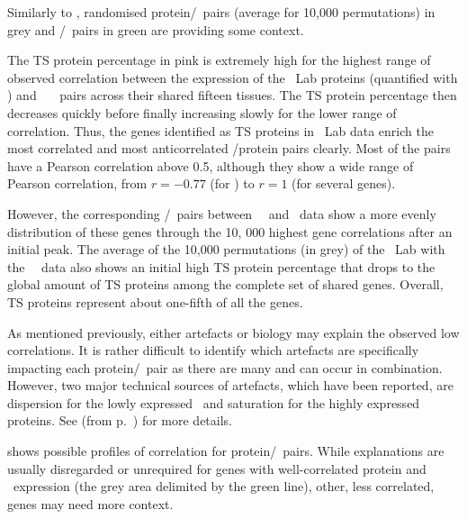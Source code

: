 Similarly to ,
randomised protein/\mRNA\ pairs (average for 10,000 permutations) in grey
and \mRNA/\mRNA\ pairs in green are providing some context.

The \gls{TS} protein percentage in pink is extremely high
for the highest range of observed correlation between the expression of
the \pandey\ Lab proteins (quantified with \PPKM) and
\uhlen\ \etal\ \mRNAs\ pairs
across their shared fifteen tissues.
The \gls{TS} protein percentage then decreases quickly
before finally increasing slowly for the lower range of correlation.
Thus, the genes identified as \gls{TS} proteins in \pandey\ Lab data enrich
the most correlated and most anticorrelated \mRNA/protein pairs clearly.
Most of the pairs have a Pearson correlation above 0.5,
although they show a wide range of Pearson correlation,
from $r= -0.77$ (for ) to $r=1$ (for several genes).

However,
the corresponding \mRNA/\mRNA\ pairs between \uhlen\ \etal\ and \gtex\ data
show a more evenly distribution of these genes
through the 10, 000 highest gene correlations after an initial peak.
The average of the 10,000 permutations (in grey) of the \pandey\ Lab
with the \uhlen\ \etal\ data also shows
an initial high \gls{TS} protein percentage that drops
to the global amount of \gls{TS} proteins among the complete set of shared genes.
Overall, \gls{TS} proteins represent about one-fifth of all the genes.

As mentioned previously,
either artefacts or biology may explain the observed low correlations.
It is rather difficult to identify
which artefacts are specifically impacting each protein/\mRNA\ pair
as there are many and can occur in combination.
However, two major technical sources of artefacts,
which have been reported,
are dispersion for the lowly expressed \mRNAs\ and
saturation for the highly expressed proteins.
See  (from p.~\pageref{sec:transExplo})
for more details.

 shows possible profiles of correlation for
protein/\mRNA\ pairs.
While explanations are usually disregarded or unrequired for genes
with well-correlated protein and \mRNA\ expression
(the grey area delimited by the green line),
other, less correlated, genes may need more context.

